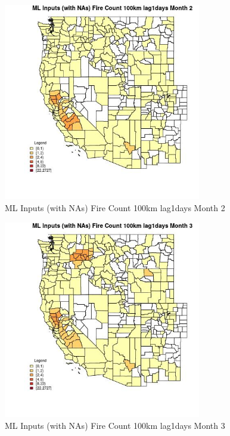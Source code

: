 \begin{figure} 
\centering  
\includegraphics[width=0.77\textwidth]{Code_Outputs/Report_ML_input_PM25_Step4_part_f_de_duplicated_aves_prioritize_24hr_obswNAs_CountyFire_Count_100km_lag1daysmedianMonth2.jpg} 
\caption{\label{fig:Report_ML_input_PM25_Step4_part_f_de_duplicated_aves_prioritize_24hr_obswNAsCountyFire_Count_100km_lag1daysmedianMonth2}ML Inputs (with NAs) Fire Count 100km lag1days Month 2} 
\end{figure} 
 

\begin{figure} 
\centering  
\includegraphics[width=0.77\textwidth]{Code_Outputs/Report_ML_input_PM25_Step4_part_f_de_duplicated_aves_prioritize_24hr_obswNAs_CountyFire_Count_100km_lag1daysmedianMonth3.jpg} 
\caption{\label{fig:Report_ML_input_PM25_Step4_part_f_de_duplicated_aves_prioritize_24hr_obswNAsCountyFire_Count_100km_lag1daysmedianMonth3}ML Inputs (with NAs) Fire Count 100km lag1days Month 3} 
\end{figure} 
 

